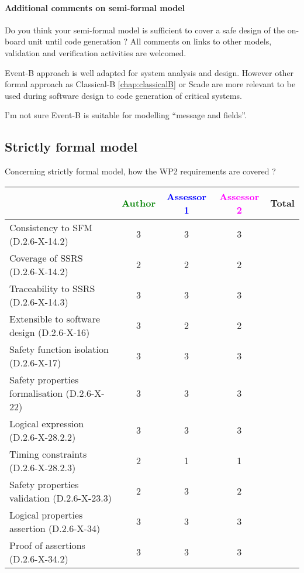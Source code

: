 \paragraph{Additional comments on semi-formal  model} Do you think your semi-formal  model is sufficient to cover a safe design of the on-board unit until code generation ?
All comments on links to  other models, validation and verification activities are welcomed.


\begin{author_comment}
Event-B  approach is well adapted for system analysis and design. However other formal approach as Classical-B \ref{chap:classicalB} or Scade are more relevant to be used during software design to code generation of critical systems.
\end{author_comment}


\begin{assessor1}
I'm not sure Event-B is suitable for modelling ``message and fields''.
\end{assessor1}


\subsection{Strictly formal model}

Concerning strictly formal model, how the WP2 requirements are covered ?

\begin{tabular}{|l | c | c | c | c|}
\hline
& \textcolor{green}{Author} & \textcolor{blue}{Assessor 1} & \textcolor{magenta}{Assessor 2} & Total \\
\hline 
Consistency to SFM (D.2.6-X-14.2) & 3 & 3 & 3 &  \\
\hline
Coverage of SSRS (D.2.6-X-14.2)  & 2 & 2 & 2 &  \\
\hline
Traceability to  SSRS (D.2.6-X-14.3)  & 3 & 3 & 3 &  \\
\hline
Extensible to software design (D.2.6-X-16)  & 3 & 2 & 2 &  \\
\hline
Safety function isolation (D.2.6-X-17)  & 3 & 3 & 3 &  \\
\hline 
Safety properties formalisation (D.2.6-X-22)  & 3 & 3 & 3 &  \\
\hline
Logical expression (D.2.6-X-28.2.2)  & 3 & 3 & 3 &  \\
\hline
Timing constraints (D.2.6-X-28.2.3)  & 2 & 1 & 1 &  \\
\hline
Safety properties validation (D.2.6-X-23.3)  & 2 & 3 & 2 &  \\
\hline
Logical properties assertion (D.2.6-X-34)  & 3 & 3 & 3 &  \\
\hline
Proof of assertions (D.2.6-X-34.2)  & 3 & 3 & 3 &  \\
\hline
\end{tabular}

